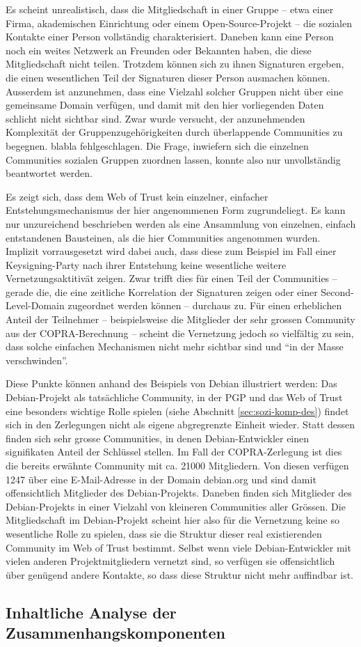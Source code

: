 Es scheint unrealistisch, dass die Mitgliedschaft in einer Gruppe --
etwa einer Firma, akademischen Einrichtung oder einem
Open-Source-Projekt -- die sozialen Kontakte einer Person
vollst\"andig charakterisiert. Daneben kann eine Person noch ein
weites Netzwerk an Freunden oder Bekannten haben, die diese
Mitgliedschaft nicht teilen. Trotzdem k\"onnen sich zu ihnen
Signaturen ergeben, die einen wesentlichen Teil der Signaturen dieser
Person ausmachen k\"onnen. Ausserdem ist anzunehmen, dass eine
Vielzahl solcher Gruppen nicht \"uber eine gemeinsame Domain
verf\"ugen, und damit mit den hier vorliegenden Daten schlicht nicht
sichtbar sind. Zwar wurde versucht, der anzunehmenden Komplexit\"at
der Gruppenzugeh\"origkeiten durch \"uberlappende Communities zu
begegnen. blabla fehlgeschlagen. Die Frage, inwiefern sich die
einzelnen Communities sozialen Gruppen zuordnen lassen, konnte also
nur unvollst\"andig beantwortet werden.

Es zeigt sich, dass dem Web of Trust kein einzelner, einfacher
Entstehungsmechanismus der hier angenommenen Form zugrundeliegt. Es
kann nur unzureichend beschrieben werden als eine Ansammlung von
einzelnen, einfach entstandenen Bausteinen, als die hier Communities
angenommen wurden. Implizit vorrausgesetzt wird dabei auch, dass diese
zum Beispiel im Fall einer Keysigning-Party nach ihrer Entstehung
keine wesentliche weitere Vernetzungsaktitiv\"at zeigen. Zwar trifft
dies f\"ur einen Teil der Communities -- gerade die, die eine
zeitliche Korrelation der Signaturen zeigen oder einer
Second-Level-Domain zugeordnet werden k\"onnen -- durchaus zu. F\"ur
einen erheblichen Anteil der Teilnehmer -- beispielsweise die
Mitglieder der sehr grossen Community aus der COPRA-Berechnung --
scheint die Vernetzung jedoch so vielf\"altig zu sein, dass solche
einfachen Mechanismen nicht mehr sichtbar sind und ``in der Masse
verschwinden''.

Diese Punkte k\"onnen anhand des Beispiels von Debian illustriert
werden: Das Debian-Projekt als tats\"achliche Community, in der
PGP und das Web of Trust eine besonders wichtige Rolle spielen (siehe
Abschnitt \ref{sec:sozi-komp-des}) findet sich in den Zerlegungen
nicht als eigene abgregrenzte Einheit wieder. Statt dessen finden sich
sehr grosse Communities, in denen Debian-Entwickler einen signifikaten
Anteil der Schl\"ussel stellen. Im Fall der COPRA-Zerlegung ist dies
die bereits erw\"ahnte Community mit ca. 21000 Mitgliedern. Von diesen
verf\"ugen 1247 \"uber eine E-Mail-Adresse in der Domain debian.org
und sind damit offensichtlich Mitglieder des Debian-Projekts. Daneben
finden sich Mitglieder des Debian-Projekts in einer Vielzahl von
kleineren Communities aller Gr\"ossen. Die Mitgliedschaft im
Debian-Projekt scheint hier also f\"ur die Vernetzung keine so
wesentliche Rolle zu spielen, dass sie die Struktur dieser real
existierenden Community im Web of Trust bestimmt. Selbst wenn viele
Debian-Entwickler mit vielen anderen Projektmitgliedern vernetzt sind,
so verf\"ugen sie offensichtlich \"uber gen\"ugend andere Kontakte,
so dass diese Struktur nicht mehr auffindbar ist.

\subsection{Inhaltliche Analyse der Zusammenhangskomponenten}
\label{sec:zusammenhangskomponenten-inhaltlich}




